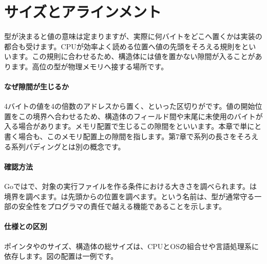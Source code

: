 \par
\endgroup
\par
\endgroup


\section{サイズとアラインメント}
\label{sec:03-runtime-data-09}

型が決まると値の意味は定まりますが、実際に何バイトをどこへ置くかは実装の都合も受けます。CPUが効率よく読める位置へ値の先頭をそろえる規則をといいます。この規則に合わせるため、構造体には値を置かない隙間が入ることがあります。高位の型が物理メモリへ接する場所です。

\begingroup
\begingroup
      \centering
      \vspace{2mm}
\paragraph{なぜ隙間が生じるか}
        4バイトの値を4の倍数のアドレスから置く、といった区切りがです。値の開始位置をこの境界へ合わせるため、構造体のフィールド間や末尾に未使用のバイトが入る場合があります。メモリ配置で生じるこの隙間をといいます。本章で単にと書く場合も、このメモリ配置上の隙間を指します。第7章で系列の長さをそろえる系列パディングとは別の概念です。

\par
\endgroup
\medskip
\begingroup
\paragraph{確認方法}
        Goではで、対象の実行ファイルを作る条件における大きさを調べられます。は境界を調べます。は先頭からの位置を調べます。という名前は、型が通常守る一部の安全性をプログラマの責任で越える機能であることを示します。

\paragraph{仕様との区別}
        ポインタやのサイズ、構造体の総サイズは、CPUとOSの組合せや言語処理系に依存します。図の配置は一例です。

\par
\endgroup
\par
\endgroup


